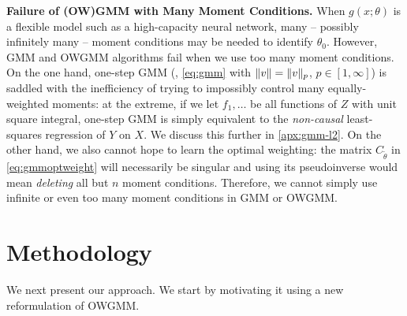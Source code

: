 \documentclass{article}
\theoremstyle{plain}
\theoremstyle{definition}
\begin{document}
{\bf Failure of (OW)GMM with Many Moment Conditions.}
When $g(x;\theta)$ is a flexible model such as a high-capacity neural network, many -- possibly infinitely many -- moment conditions may be needed to identify $\theta_0$. However,
GMM and OWGMM algorithms fail when we use too many moment conditions. On the one hand, one-step GMM (\ie, \cref{eq:gmm} with $\|v\|=\|v\|_p$, $p\in[1,\infty]$) is saddled with the inefficiency of trying to impossibly control many equally-weighted moments:
at the extreme, if we let $f_1,\dots$ be all functions of $Z$ with unit square integral, one-step GMM is simply equivalent to the \emph{non-causal} least-squares regression of $Y$ on $X$. We discuss this further in \cref{apx:gmm-l2}.
%
On the other hand, we also cannot hope to learn the optimal weighting: the matrix $C_{\tilde\theta}$ in \cref{eq:gmmoptweight} will necessarily be singular
%
%
and using its pseudoinverse would mean \emph{deleting} all but $n$ moment conditions. 
Therefore, we cannot simply use infinite or even too many moment conditions in GMM or OWGMM.

%
%
%
%
%
%

%
%

%
%
%
%
%
%
%
%
%
%
%
%

%

%

%
%

\section{Methodology}


%
%
%
%
%
%

%
%

We next present our approach. We start by motivating it using a new reformulation of OWGMM.
\end{document}
